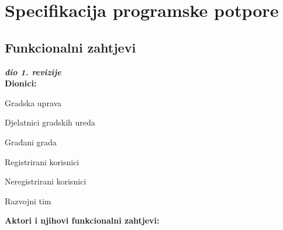\chapter{Specifikacija programske potpore}
		
	\section{Funkcionalni zahtjevi}
			
			\textbf{\textit{dio 1. revizije}}\\
			
			\noindent \textbf{Dionici:}
			
			\begin{packed_enum}
				\item Gradska uprava
				\item Djelatnici gradskih ureda		
				\item Građani grada
				\item[] \begin{packed_item}
					\item Registrirani korisnici
					\item Neregistrirani korisnici
				\end{packed_item}
				\item Razvojni tim
			\end{packed_enum}
			
			
			\noindent \textbf{Aktori i njihovi funkcionalni zahtjevi:}
			
